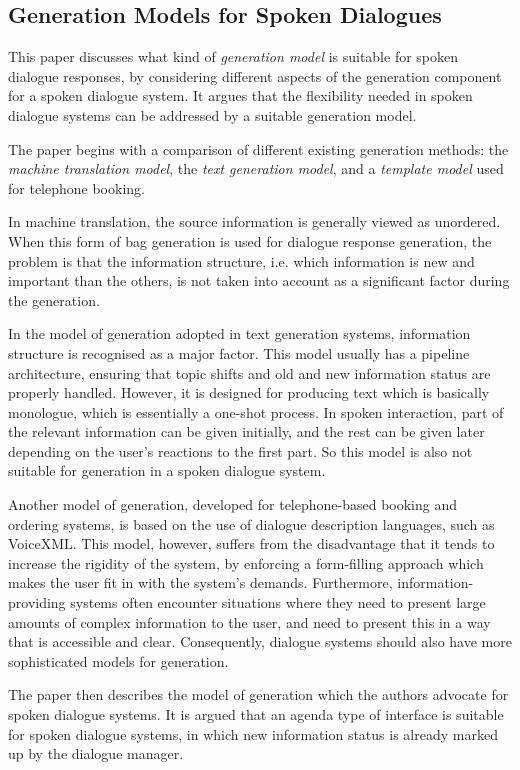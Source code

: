 \subsection{Generation Models for Spoken Dialogues \cite{wilcock2003}}

This paper discusses what kind of \emph{generation model} is suitable for spoken dialogue responses, by considering different aspects of the generation component for a spoken dialogue system. It argues that the flexibility needed in spoken dialogue systems can be addressed by a suitable generation model.

The paper begins with a comparison of different existing generation methods: the \emph{machine translation model}, the \emph{text generation model}, and a \emph{template model} used for telephone booking.

In machine translation, the source information is generally viewed as unordered. When this form of bag generation is used for dialogue response generation, the problem is that the information structure, i.e. which information is new and important than the others, is not taken into account as a significant factor during the generation.

In the model of generation adopted in text generation systems, information structure is recognised as a major factor. This model usually has a pipeline architecture, ensuring that topic shifts and old and new information status are properly handled. However, it is designed for producing text which is basically monologue, which is essentially a one-shot process. In spoken interaction, part of the relevant information can be given initially, and the rest can be given later depending on the user's reactions to the first part. So this model is also not suitable for generation in a spoken dialogue system.

Another model of generation, developed for telephone-based booking and ordering systems, is based on the use of dialogue description languages, such as VoiceXML. This model, however, suffers from the disadvantage that it tends to increase the rigidity of the system, by enforcing a form-filling approach which makes the user fit in with the system's demands. Furthermore, information-providing systems often encounter situations where they need to present large amounts of complex information to the user, and need to present this in a way that is accessible and clear. Consequently, dialogue systems should also have more sophisticated models for generation.

The paper then describes the model of generation which the authors advocate for spoken dialogue systems. It is argued that an agenda type of interface is suitable for spoken dialogue systems, in which new information status is already marked up by the dialogue manager.

